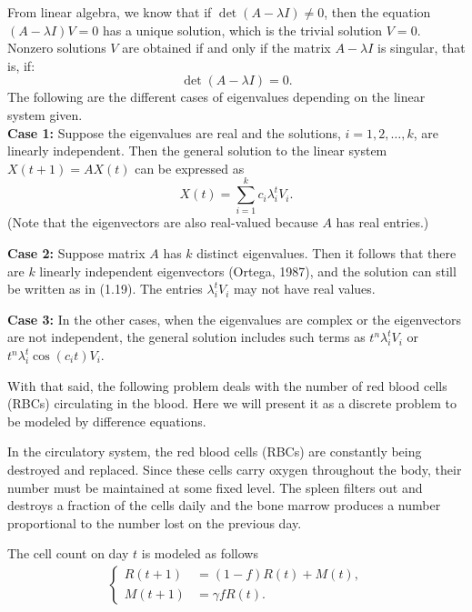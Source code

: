 \documentclass [a4paper]{article}
\begin{document}
From linear algebra, we know that if \( \det(A - \lambda I) \neq 0 \), then the equation \( (A - \lambda I)V = 0 \) has a unique solution, which is the trivial solution \( V = 0 \). Nonzero solutions \( V \) are obtained if and only if the matrix \( A - \lambda I \) is singular, that is, if:
\[
\det(A - \lambda I) = 0.
\]
The following are the different cases of eigenvalues depending on the linear system given.\\

\textbf{Case 1:} Suppose the eigenvalues are real and the solutions, $i = 1, 2, \dots, k$, are linearly independent. Then the general solution to the linear system $X(t + 1) = AX(t)$ can be expressed as
\[
X(t) = \sum_{i=1}^k c_i \lambda_i^t V_i. 
\]
(Note that the eigenvectors are also real-valued because $A$ has real entries.)

\textbf{Case 2:} Suppose matrix $A$ has $k$ distinct eigenvalues. Then it follows that there are $k$ linearly independent eigenvectors (Ortega, 1987), and the solution can still be written as in (1.19). The entries $\lambda_i^t V_i$ may not have real values.

\textbf{Case 3:} In the other cases, when the eigenvalues are complex or the eigenvectors are not independent, the general solution includes such terms as $t^n \lambda_i^t V_i$ or $t^n \lambda_i^t \cos(c_i t) V_i$.\cite{linda}
\newpage

With that said, the following problem deals with the number of red blood cells (RBCs) circulating in the blood. Here we will present it as a discrete problem to be modeled by difference equations.

In the circulatory system, the red blood cells (RBCs) are constantly being destroyed and replaced. Since these cells carry oxygen throughout the body, their number must be maintained at some fixed level. The spleen filters out and destroys a fraction of the cells daily and the bone marrow produces a number proportional to the number lost on the previous day. \cite{edelstein2005mathematical}

The cell count on day \(t\) is modeled as follows\\

\begin{align*}
\begin{cases}
  R(t+1) &= (1 - f)R(t) + M(t), \\
  M(t+1) &= \gamma f R(t).
\end{cases}    
\end{align*}
\end{document}
